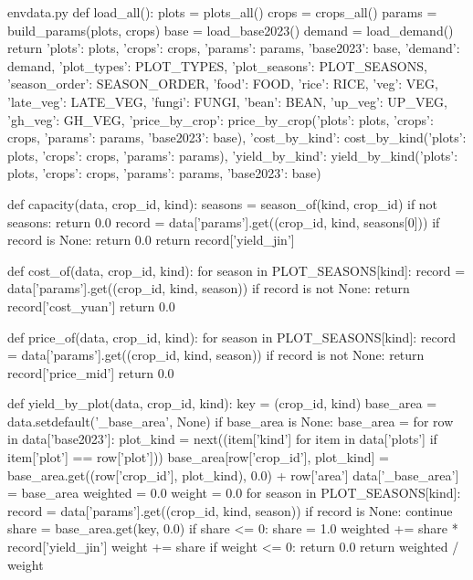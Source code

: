 \documentclass[bwprint]{gmcmthesis}
\begin{document}
\begin{appendices}
\begin{Python}{envdata.py}
def load_all():
    plots = plots_all()
    crops = crops_all()
    params = build_params(plots, crops)
    base = load_base2023()
    demand = load_demand()
    return {'plots': plots, 'crops': crops, 'params': params, 'base2023': base, 'demand': demand, 'plot_types': PLOT_TYPES, 'plot_seasons': PLOT_SEASONS, 'season_order': SEASON_ORDER, 'food': FOOD, 'rice': RICE, 'veg': VEG, 'late_veg': LATE_VEG, 'fungi': FUNGI, 'bean': BEAN, 'up_veg': UP_VEG, 'gh_veg': GH_VEG, 'price_by_crop': price_by_crop({'plots': plots, 'crops': crops, 'params': params, 'base2023': base}), 'cost_by_kind': cost_by_kind({'plots': plots, 'crops': crops, 'params': params}), 'yield_by_kind': yield_by_kind({'plots': plots, 'crops': crops, 'params': params, 'base2023': base})}

def capacity(data, crop_id, kind):
    seasons = season_of(kind, crop_id)
    if not seasons:
        return 0.0
    record = data['params'].get((crop_id, kind, seasons[0]))
    if record is None:
        return 0.0
    return record['yield_jin']

def cost_of(data, crop_id, kind):
    for season in PLOT_SEASONS[kind]:
        record = data['params'].get((crop_id, kind, season))
        if record is not None:
            return record['cost_yuan']
    return 0.0

def price_of(data, crop_id, kind):
    for season in PLOT_SEASONS[kind]:
        record = data['params'].get((crop_id, kind, season))
        if record is not None:
            return record['price_mid']
    return 0.0

def yield_by_plot(data, crop_id, kind):
    key = (crop_id, kind)
    base_area = data.setdefault('_base_area', None)
    if base_area is None:
        base_area = {}
        for row in data['base2023']:
            plot_kind = next((item['kind'] for item in data['plots'] if item['plot'] == row['plot']))
            base_area[row['crop_id'], plot_kind] = base_area.get((row['crop_id'], plot_kind), 0.0) + row['area']
        data['_base_area'] = base_area
    weighted = 0.0
    weight = 0.0
    for season in PLOT_SEASONS[kind]:
        record = data['params'].get((crop_id, kind, season))
        if record is None:
            continue
        share = base_area.get(key, 0.0)
        if share <= 0:
            share = 1.0
        weighted += share * record['yield_jin']
        weight += share
    if weight <= 0:
        return 0.0
    return weighted / weight


\end{Python}
\end{appendices}
\end{document}
